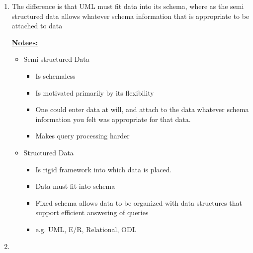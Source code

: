 \documentclass[12pt]{article}
\begin{document}
\begin{enumerate}[1.]
    \item

    The difference is that UML must fit data into its schema, where as the semi
    structured data allows whatever schema information that is appropriate to be attached to data

    \bigskip

    \underline{\textbf{Notees:}}

    \bigskip

    \begin{itemize}
        \item Semi-structured Data
        \begin{itemize}
            \item Is schemaless
            \item Is motivated primarily by its flexibility
            \item One could enter data at will, and attach to the data whatever schema information
            you felt was appropriate for that data.
            \item Makes query processing harder
        \end{itemize}
        \item Structured Data
        \begin{itemize}
            \item Is rigid framework into which data is placed.
            \item Data must fit into schema
            \item Fixed schema allows data to be organized with data structures
            that support efficient answering of queries
            \item e.g. UML, E/R, Relational, ODL
        \end{itemize}
    \end{itemize}

    \item

    \bigskip


\end{enumerate}
\end{document}
